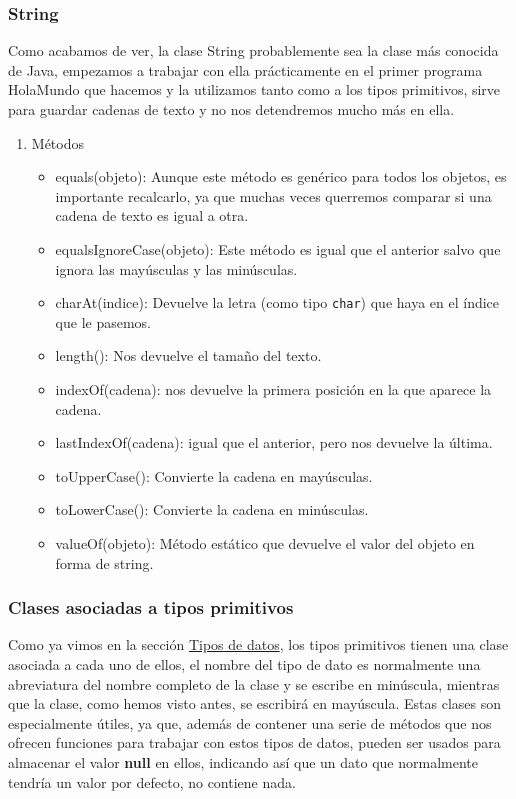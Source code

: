 \documentclass[11pt]{article}
\begin{document}
\subsubsection{String}
\label{sec:orgace8756}
Como acabamos de ver, la clase String probablemente sea la clase más conocida de Java, empezamos a trabajar con ella prácticamente en el primer programa HolaMundo que hacemos y la utilizamos tanto como a los tipos primitivos, sirve para guardar cadenas de texto y no nos detendremos mucho más en ella.

\begin{enumerate}
\item Métodos
\label{sec:orgcdc3817}
\begin{itemize}
\item equals(objeto): Aunque este método es genérico para todos los objetos, es importante recalcarlo, ya que muchas veces querremos comparar si una cadena de texto es igual a otra.
\item equalsIgnoreCase(objeto): Este método es igual que el anterior salvo que ignora las mayúsculas y las minúsculas.
\item charAt(indice): Devuelve la letra (como tipo \texttt{char}) que haya en el índice que le pasemos.
\item length(): Nos devuelve el tamaño del texto.
\item indexOf(cadena): nos devuelve la primera posición en la que aparece la cadena.
\item lastIndexOf(cadena): igual que el anterior, pero nos devuelve la última.
\item toUpperCase(): Convierte la cadena en mayúsculas.
\item toLowerCase(): Convierte la cadena en minúsculas.
\item valueOf(objeto): Método estático que devuelve el valor del objeto en forma de string.
\end{itemize}
\end{enumerate}

\subsubsection{Clases asociadas a tipos primitivos}
\label{sec:org56e83c7}
Como ya vimos en la sección \hyperref[orga663cae]{Tipos de datos}, los tipos primitivos tienen una clase asociada a cada uno de ellos, el nombre del tipo de dato es normalmente una abreviatura del nombre completo de la clase y se escribe en minúscula, mientras que la clase, como hemos visto antes, se escribirá en mayúscula. Estas clases son especialmente útiles, ya que, además de contener una serie de métodos que nos ofrecen funciones para trabajar con estos tipos de datos, pueden ser usados para almacenar el valor \textbf{null} en ellos, indicando así que un dato que normalmente tendría un valor por defecto, no contiene nada.
\end{document}
